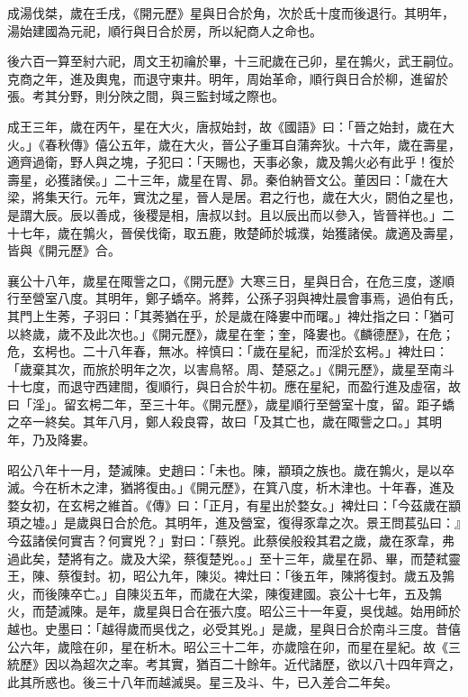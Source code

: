 \begin{pinyinscope}
 成湯伐桀，歲在壬戌，《開元歷》星與日合於角，次於氐十度而後退行。其明年，湯始建國為元祀，順行與日合於房，所以紀商人之命也。



 後六百一算至紂六祀，周文王初禴於畢，十三祀歲在己卯，星在鶉火，武王嗣位。克商之年，進及輿鬼，而退守東井。明年，周始革命，順行與日合於柳，進留於張。考其分野，則分陜之間，與三監封域之際也。



 成王三年，歲在丙午，星在大火，唐叔始封，故《國語》曰：「晉之始封，歲在大火。」《春秋傳》僖公五年，歲在大火，晉公子重耳自蒲奔狄。十六年，歲在壽星，適齊過衛，野人與之塊，子犯曰：「天賜也，天事必象，歲及鶉火必有此乎！復於壽星，必獲諸侯。」二十三年，歲星在胃、昴。秦伯納晉文公。董因曰：「歲在大梁，將集天行。元年，實沈之星，晉人是居。君之行也，歲在大火，閼伯之星也，是謂大辰。辰以善成，後稷是相，唐叔以封。且以辰出而以參入，皆晉祥也。」二十七年，歲在鶉火，晉侯伐衛，取五鹿，敗楚師於城濮，始獲諸侯。歲適及壽星，皆與《開元歷》合。



 襄公十八年，歲星在陬訾之口，《開元歷》大寒三日，星與日合，在危三度，遂順行至營室八度。其明年，鄭子蟜卒。將葬，公孫子羽與裨灶晨會事焉，過伯有氏，其門上生莠，子羽曰：「其莠猶在乎，於是歲在降婁中而曙。」裨灶指之曰：「猶可以終歲，歲不及此次也。」《開元歷》，歲星在奎；奎，降婁也。《麟德歷》，在危；危，玄枵也。二十八年春，無冰。梓慎曰：「歲在星紀，而淫於玄枵。」裨灶曰：「歲棄其次，而旅於明年之次，以害鳥帑。周、楚惡之。」《開元歷》，歲星至南斗十七度，而退守西建間，復順行，與日合於牛初。應在星紀，而盈行進及虛宿，故曰「淫」。留玄枵二年，至三十年。《開元歷》，歲星順行至營室十度，留。距子蟜之卒一終矣。其年八月，鄭人殺良霄，故曰「及其亡也，歲在陬訾之口。」其明年，乃及降婁。



 昭公八年十一月，楚滅陳。史趙曰：「未也。陳，顓頊之族也。歲在鶉火，是以卒滅。今在析木之津，猶將復由。」《開元歷》，在箕八度，析木津也。十年春，進及婺女初，在玄枵之維首。《傳》曰：「正月，有星出於婺女。」裨灶曰：「今茲歲在顓頊之墟。」是歲與日合於危。其明年，進及營室，復得豕韋之次。景王問萇弘曰：』今茲諸侯何實吉？何實兇？」對曰：「蔡兇。此蔡侯般殺其君之歲，歲在豕韋，弗過此矣，楚將有之。歲及大梁，蔡復楚兇。。」至十三年，歲星在昴、畢，而楚弒靈王，陳、蔡復封。初，昭公九年，陳災。裨灶曰：「後五年，陳將復封。歲五及鶉火，而後陳卒亡。」自陳災五年，而歲在大梁，陳復建國。哀公十七年，五及鶉火，而楚滅陳。是年，歲星與日合在張六度。昭公三十一年夏，吳伐越。始用師於越也。史墨曰：「越得歲而吳伐之，必受其兇。」是歲，星與日合於南斗三度。昔僖公六年，歲陰在卯，星在析木。昭公三十二年，亦歲陰在卯，而星在星紀。故《三統歷》因以為超次之率。考其實，猶百二十餘年。近代諸歷，欲以八十四年齊之，此其所惑也。後三十八年而越滅吳。星三及斗、牛，已入差合二年矣。




\end{pinyinscope}
